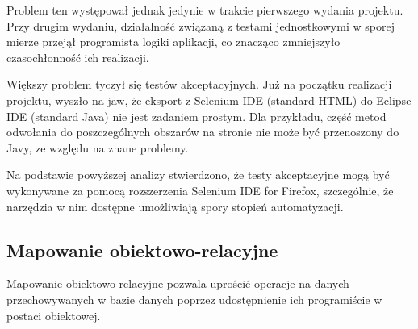 Problem ten występował jednak jedynie w trakcie pierwszego wydania projektu. Przy drugim wydaniu, działalność związaną z testami jednostkowymi w sporej mierze przejął programista logiki aplikacji, co znacząco zmniejszyło czasochłonność ich realizacji.

Większy problem tyczył się testów akceptacyjnych. Już na początku realizacji projektu, wyszło na jaw, że eksport z Selenium IDE (standard HTML) do Eclipse IDE (standard Java) nie jest zadaniem prostym. Dla przykładu, część metod odwołania do poszczególnych obszarów na stronie nie może być przenoszony do Javy, ze względu na znane problemy.

Na podstawie powyższej analizy stwierdzono, że testy akceptacyjne mogą być wykonywane za pomocą rozszerzenia Selenium IDE for Firefox, szczególnie, że narzędzia w nim dostępne umożliwiają spory stopień automatyzacji.


\subsection{Mapowanie obiektowo-relacyjne}
\label{Chapter62c}

Mapowanie obiektowo-relacyjne pozwala uprościć operacje na danych przechowywanych w bazie danych poprzez udostępnienie ich programiście w postaci obiektowej. \\

